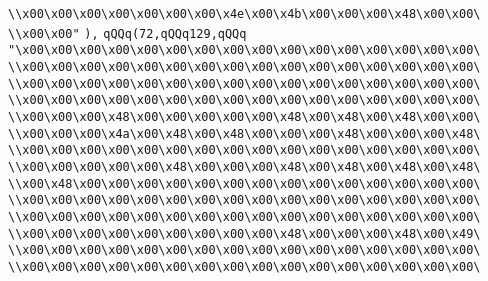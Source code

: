 \verb|\\x00\x00\x00\x00\x00\x00\x00\x4e\x00\x4b\x00\x00\x00\x48\x00\x00\|\newline
\verb|\\x00\x00"|\newline
\verb|),|\newline
\verb|qQQq(72,qQQq129,qQQq|\newline
\verb|"\x00\x00\x00\x00\x00\x00\x00\x00\x00\x00\x00\x00\x00\x00\x00\x00\|\newline
\verb|\\x00\x00\x00\x00\x00\x00\x00\x00\x00\x00\x00\x00\x00\x00\x00\x00\|\newline
\verb|\\x00\x00\x00\x00\x00\x00\x00\x00\x00\x00\x00\x00\x00\x00\x00\x00\|\newline
\verb|\\x00\x00\x00\x00\x00\x00\x00\x00\x00\x00\x00\x00\x00\x00\x00\x00\|\newline
\verb|\\x00\x00\x00\x48\x00\x00\x00\x00\x00\x48\x00\x48\x00\x48\x00\x00\|\newline
\verb|\\x00\x00\x00\x4a\x00\x48\x00\x48\x00\x00\x00\x48\x00\x00\x00\x48\|\newline
\verb|\\x00\x00\x00\x00\x00\x00\x00\x00\x00\x00\x00\x00\x00\x00\x00\x00\|\newline
\verb|\\x00\x00\x00\x00\x00\x48\x00\x00\x00\x48\x00\x48\x00\x48\x00\x48\|\newline
\verb|\\x00\x48\x00\x00\x00\x00\x00\x00\x00\x00\x00\x00\x00\x00\x00\x00\|\newline
\verb|\\x00\x00\x00\x00\x00\x00\x00\x00\x00\x00\x00\x00\x00\x00\x00\x00\|\newline
\verb|\\x00\x00\x00\x00\x00\x00\x00\x00\x00\x00\x00\x00\x00\x00\x00\x00\|\newline
\verb|\\x00\x00\x00\x00\x00\x00\x00\x00\x00\x48\x00\x00\x00\x48\x00\x49\|\newline
\verb|\\x00\x00\x00\x00\x00\x00\x00\x00\x00\x00\x00\x00\x00\x00\x00\x00\|\newline
\verb|\\x00\x00\x00\x00\x00\x00\x00\x00\x00\x00\x00\x00\x00\x00\x00\x00\|\newline
